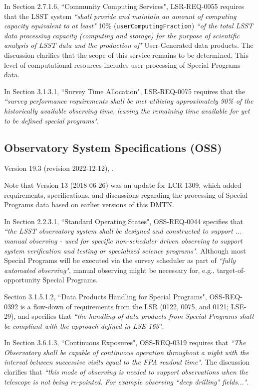 In Section 2.7.1.6, ``Community Computing Services", LSR-REQ-0055 requires that the LSST system 
{\it ``shall provide and maintain an amount of computing capacity equivalent to at least"} 10\% 
({\tt userComputingFraction}) {\it ``of the total LSST data processing capacity 
(computing and storage) for the purpose of scientific analysis of LSST data and the production of"} User-Generated 
data products. 
The discussion clarifies that the scope of this service remains to be determined.
This level of computational resources includes user processing of Special Programs data.

In Section 3.1.3.1, ``Survey Time Allocation", LSR-REQ-0075 requires that the {\it ``survey performance 
requirements shall be met utilizing approximately 90\% of the historically available observing time, leaving the 
remaining time available for yet to be defined special programs"}.


\subsection{Observatory System Specifications (OSS)}

Version 19.3 (revision 2022-12-12), .

Note that Version 13 (2018-06-26) was an update for LCR-1309, which added requirements, specifications, and discussions regarding the processing of Special Programs data based on earlier versions of this DMTN.

In Section 2.2.3.1, ``Standard Operating States", OSS-REQ-0044 specifies that {\it ``the LSST 
observatory system shall be designed and constructed to support ... manual observing - used for specific 
non-scheduler driven observing to support system verification and testing or specialized science programs"}. 
Although most Special Programs will be executed via the survey scheduler as part of {\it ``fully automated 
observing"}, manual observing might be necessary for, e.g., target-of-opportunity Special Programs.

Section 3.1.5.1.2, ``Data Products Handling for Special Programs", OSS-REQ-0392 is a flow-down of 
requirements from the LSR (0122, 0075, and 0121; LSE-29), and specifies that {\it ``the handling of data products 
from Special Programs shall be compliant with the approach defined in LSE-163"}.

In Section 3.6.1.3, ``Continuous Exposures", OSS-REQ-0319 requires that {\it ``The Observatory shall be 
capable of continuous operation throughout a night with the interval between successive visits equal to the FPA 
readout time"}.
The discussion clarifies that {\it ``this mode of observing is needed to support observations when the telescope is 
not being re-pointed. For example observing ``deep drilling" fields..."}.

